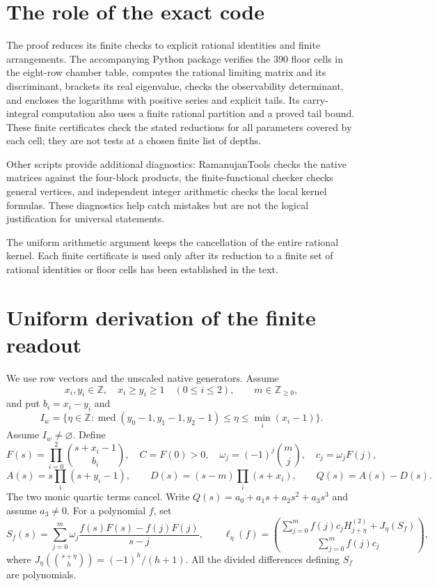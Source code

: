 \documentclass[11pt]{article}
\begin{document}
\section{The role of the exact code}
The proof reduces its finite checks to explicit rational identities and
finite arrangements. The accompanying Python package verifies the
390 floor cells in the eight-row chamber table, computes the rational
limiting matrix and its discriminant, brackets its real eigenvalue,
checks the observability determinant, and encloses the logarithms with
positive series and explicit tails. Its carry-integral computation also
uses a finite rational partition and a proved tail bound.
These finite certificates check the stated reductions for all parameters
covered by each cell; they are not tests at a chosen finite list of depths.

Other scripts provide additional diagnostics: RamanujanTools checks the
native matrices against the four-block products, the finite-functional
checker checks general vertices, and independent integer arithmetic
checks the local kernel formulas. These diagnostics help catch mistakes
but are not the logical justification for universal statements.

The uniform arithmetic argument keeps the cancellation of the entire
rational kernel. Each finite certificate is used only after its
reduction to a finite set of rational identities or floor cells has
been established in the text.


\appendix
\section{Uniform derivation of the finite readout}\label{app:finite}



We use row vectors and the unscaled native generators.  Assume
\[
 x_i,y_i\in\mathbb Z,\quad x_i\ge y_i\ge1\quad(0\le i\le2),
 \qquad m\in\mathbb Z_{\ge0},
\]
and put $b_i=x_i-y_i$ and
\[
 I_w=\{\eta\in\mathbb Z:
 \operatorname{med}(y_0-1,y_1-1,y_2-1)
 \le\eta\le\min_i(x_i-1)\}.
\]
Assume $I_w\ne\varnothing$. Define
\[
 F(s)=\prod_{i=0}^2\binom{s+x_i-1}{b_i},\quad C=F(0)>0,
 \quad \omega_j=(-1)^j\binom mj,\quad c_j=\omega_jF(j),
\]
\[
 A(s)=s\prod_i(s+y_i-1),\qquad
 D(s)=(s-m)\prod_i(s+x_i),\qquad Q(s)=A(s)-D(s).
\]
The two monic quartic terms cancel.  Write
$Q(s)=a_0+a_1s+a_2s^2+a_3s^3$ and assume $a_3\ne0$.
For a polynomial $f$, set
\[
 S_f(s)=\sum_{j=0}^m\omega_j
   \frac{f(s)F(s)-f(j)F(j)}{s-j},\qquad
 \ell_\eta(f)=\binom{
 \sum_{j=0}^m f(j)c_jH_{j+\eta}^{(2)}+J_\eta(S_f)}{
 \sum_{j=0}^m f(j)c_j},
\]
where $J_\eta(\binom{s+\eta}{h})=(-1)^h/(h+1)$.
All the divided differences defining $S_f$ are polynomials.
\end{document}
